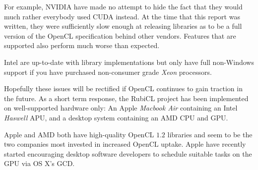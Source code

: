   For example, NVIDIA have made no attempt to hide the fact that they would much rather everybody used \ac{CUDA} instead. At the time that this report was written, they were sufficiently slow enough at releasing libraries as to be a full version of the \ac{OpenCL} specification behind other vendors. Features that are supported also perform much worse than expected.

  Intel are up-to-date with library implementations but only have full non-Windows support if you have purchased non-consumer grade \emph{Xeon} processors.

  Hopefully these issues will be rectified if \ac{OpenCL} continues to gain traction in the future. As a short term response, the RubiCL project has been implemented on well-supported hardware only: An Apple \emph{Macbook Air} containing an Intel \emph{Haswell} \ac{APU}, and a desktop system containing an \ac{AMD} \ac{CPU} and \ac{GPU}.

  Apple and \ac{AMD} both have high-quality \ac{OpenCL} $1.2$ libraries and seem to be the two companies most invested in increased \ac{OpenCL} uptake. Apple have recently started encouraging desktop software developers to schedule suitable tasks on the \ac{GPU} via OS X's \ac{GCD}.
